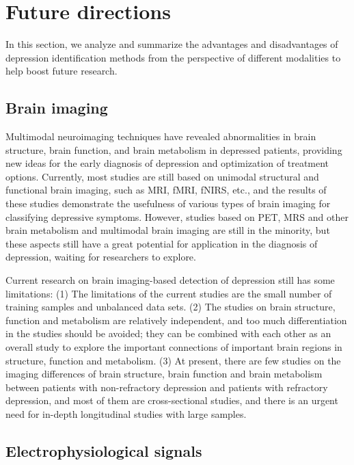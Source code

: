 
\ifx\allfiles\undefined
    
\fi
\section{Future  directions}

In this section, we analyze and summarize the advantages and disadvantages of depression identification methods from the perspective of different modalities to help boost future research.

\subsection{Brain imaging}

Multimodal neuroimaging techniques have revealed abnormalities in brain structure, brain function, and brain metabolism in depressed patients, providing new ideas for the early diagnosis of depression and optimization of treatment options. Currently, most studies are still based on unimodal structural and functional brain imaging, such as MRI, fMRI, fNIRS, etc., and the results of these studies demonstrate the usefulness of various types of brain imaging for classifying depressive symptoms. However, studies based on PET, MRS and other brain metabolism and multimodal brain imaging are still in the minority, but these aspects still have a great potential for application in the diagnosis of depression, waiting for researchers to explore.

Current research on brain imaging-based detection of depression still has some limitations: (1) The limitations of the current studies are the small number of training samples and unbalanced data sets. (2) The studies on brain structure, function and metabolism are relatively independent, and too much differentiation in the studies should be avoided; they can be combined with each other as an overall study to explore the important connections of important brain regions in structure, function and metabolism. (3) At present, there are few studies on the imaging differences of brain structure, brain function and brain metabolism between patients with non-refractory depression and patients with refractory depression, and most of them are cross-sectional studies, and there is an urgent need for in-depth longitudinal studies with large samples.

\subsection{Electrophysiological signals}

